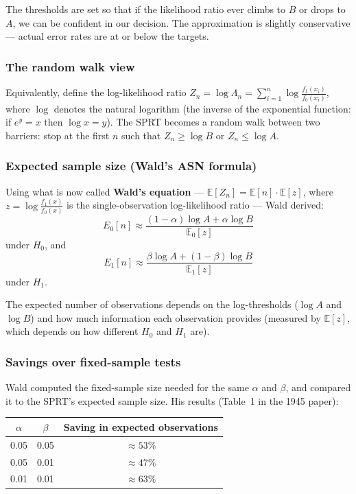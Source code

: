 \documentclass[12pt, a4paper]{article}
\newcommand{\E}{\mathbb{E}}            %
\newcommand{\LR}{\Lambda}              %
\begin{document}
\begin{plainlanguage}
The thresholds are set so that if the likelihood ratio ever climbs to $B$ or
drops to $A$, we can be confident in our decision.  The approximation is
slightly conservative --- actual error rates are at or below the targets.
\end{plainlanguage}

\subsubsection*{The random walk view}

Equivalently, define the log-likelihood ratio $Z_n = \log \LR_n =
\sum_{i=1}^n \log \frac{f_1(x_i)}{f_0(x_i)}$, where $\log$ denotes the
natural logarithm (the inverse of the exponential function: if $e^y = x$
then $\log x = y$).  The SPRT becomes a random
walk between two barriers: stop at the first $n$ such that $Z_n \geq \log B$
or $Z_n \leq \log A$.

\subsubsection*{Expected sample size (Wald's ASN formula)}

Using what is now called \textbf{Wald's equation} --- $\E[Z_n] = \E[n]
\cdot \E[z]$, where $z = \log \frac{f_1(x)}{f_0(x)}$ is the single-observation
log-likelihood ratio --- Wald derived:
\[
  \boxed{E_0[n] \approx \frac{(1-\alpha)\log A + \alpha \log B}{\E_0[z]}}
\]
under $H_0$, and
\[
  \boxed{E_1[n] \approx \frac{\beta \log A + (1-\beta)\log B}{\E_1[z]}}
\]
under $H_1$.

\begin{plainlanguage}
The expected number of observations depends on the log-thresholds ($\log A$
and $\log B$) and how much information each observation provides (measured by
$\E[z]$, which depends on how different $H_0$ and $H_1$ are).
\end{plainlanguage}

\subsubsection*{Savings over fixed-sample tests}

Wald computed the fixed-sample size needed for the same $\alpha$ and $\beta$,
and compared it to the SPRT's expected sample size.  His results (Table~1 in
the 1945 paper):

\begin{center}
\begin{tabular}{@{} c c c @{}}
\toprule
$\alpha$ & $\beta$ & \textbf{Saving in expected observations} \\
\midrule
0.05 & 0.05 & $\approx 53\%$ \\
0.05 & 0.01 & $\approx 47\%$ \\
0.01 & 0.01 & $\approx 63\%$ \\
\bottomrule
\end{tabular}
\end{center}
\end{document}
